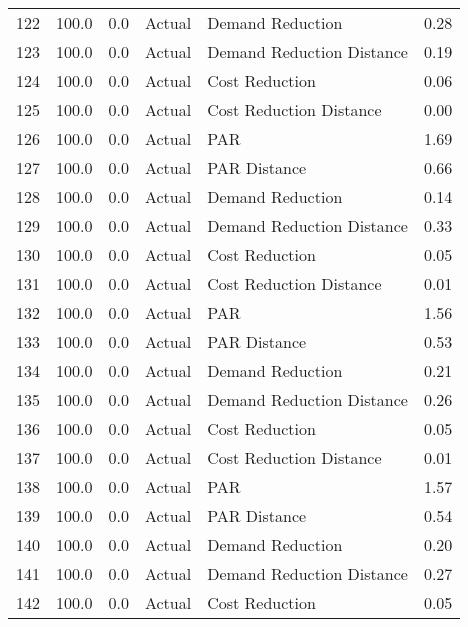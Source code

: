 \begin{longtable}{lrrllr}
122  &        100.0 &     0.0 &         Actual &           Demand Reduction &   0.28 \\
123  &        100.0 &     0.0 &         Actual &  Demand Reduction Distance &   0.19 \\
124  &        100.0 &     0.0 &         Actual &             Cost Reduction &   0.06 \\
125  &        100.0 &     0.0 &         Actual &    Cost Reduction Distance &   0.00 \\
126  &        100.0 &     0.0 &         Actual &                        PAR &   1.69 \\
127  &        100.0 &     0.0 &         Actual &               PAR Distance &   0.66 \\
128  &        100.0 &     0.0 &         Actual &           Demand Reduction &   0.14 \\
129  &        100.0 &     0.0 &         Actual &  Demand Reduction Distance &   0.33 \\
130  &        100.0 &     0.0 &         Actual &             Cost Reduction &   0.05 \\
131  &        100.0 &     0.0 &         Actual &    Cost Reduction Distance &   0.01 \\
132  &        100.0 &     0.0 &         Actual &                        PAR &   1.56 \\
133  &        100.0 &     0.0 &         Actual &               PAR Distance &   0.53 \\
134  &        100.0 &     0.0 &         Actual &           Demand Reduction &   0.21 \\
135  &        100.0 &     0.0 &         Actual &  Demand Reduction Distance &   0.26 \\
136  &        100.0 &     0.0 &         Actual &             Cost Reduction &   0.05 \\
137  &        100.0 &     0.0 &         Actual &    Cost Reduction Distance &   0.01 \\
138  &        100.0 &     0.0 &         Actual &                        PAR &   1.57 \\
139  &        100.0 &     0.0 &         Actual &               PAR Distance &   0.54 \\
140  &        100.0 &     0.0 &         Actual &           Demand Reduction &   0.20 \\
141  &        100.0 &     0.0 &         Actual &  Demand Reduction Distance &   0.27 \\
142  &        100.0 &     0.0 &         Actual &             Cost Reduction &   0.05 \\

\end{longtable}
